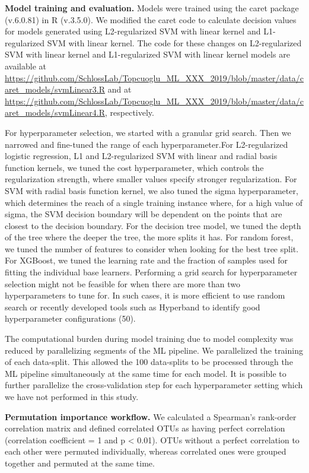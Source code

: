 \documentclass[11pt,]{article}
\begin{document}
\textbf{Model training and evaluation.} Models were trained using the
caret package (v.6.0.81) in R (v.3.5.0). We modified the caret code to
calculate decision values for models generated using L2-regularized SVM
with linear kernel and L1-regularized SVM with linear kernel. The code
for these changes on L2-regularized SVM with linear kernel and
L1-regularized SVM with linear kernel models are available at
\url{https://github.com/SchlossLab/Topcuoglu_ML_XXX_2019/blob/master/data/caret_models/svmLinear3.R}
and at
\url{https://github.com/SchlossLab/Topcuoglu_ML_XXX_2019/blob/master/data/caret_models/svmLinear4.R},
respectively.

For hyperparameter selection, we started with a granular grid search.
Then we narrowed and fine-tuned the range of each hyperparameter.For
L2-regularized logistic regression, L1 and L2-regularized SVM with
linear and radial basis function kernels, we tuned the cost
hyperparameter, which controls the regularization strength, where
smaller values specify stronger regularization. For SVM with radial
basis function kernel, we also tuned the sigma hyperparameter, which
determines the reach of a single training instance where, for a high
value of sigma, the SVM decision boundary will be dependent on the
points that are closest to the decision boundary. For the decision tree
model, we tuned the depth of the tree where the deeper the tree, the
more splits it has. For random forest, we tuned the number of features
to consider when looking for the best tree split. For XGBoost, we tuned
the learning rate and the fraction of samples used for fitting the
individual base learners. Performing a grid search for hyperparameter
selection might not be feasible for when there are more than two
hyperparameters to tune for. In such cases, it is more efficient to use
random search or recently developed tools such as Hyperband to identify
good hyperparameter configurations (50).

The computational burden during model training due to model complexity
was reduced by parallelizing segments of the ML pipeline. We
parallelized the training of each data-split. This allowed the 100
data-splits to be processed through the ML pipeline simultaneously at
the same time for each model. It is possible to further parallelize the
cross-validation step for each hyperparameter setting which we have not
performed in this study.

\textbf{Permutation importance workflow.} We calculated a Spearman's
rank-order correlation matrix and defined correlated OTUs as having
perfect correlation (correlation coefficient = 1 and p \textless{}
0.01). OTUs without a perfect correlation to each other were permuted
individually, whereas correlated ones were grouped together and permuted
at the same time.
\end{document}
